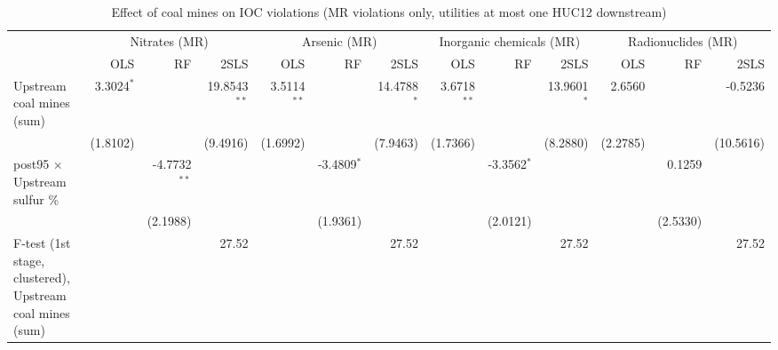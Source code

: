 
\begin{table}[htbp]
   
   \caption{\label{2sls_dwnstrm_minevio_mr_ivsum} Effect of coal mines on IOC violations (MR violations only, utilities at most one HUC12 downstream)}
   \bigskip
   
   \centering
   
   \begin{adjustbox}{width = \textwidth, center}
      
      
      \begin{tabular}{lrrrrrrrrrrrr}
         \toprule
         
          & \multicolumn{3}{c}{Nitrates (MR)} & \multicolumn{3}{c}{Arsenic (MR)} & \multicolumn{3}{c}{Inorganic chemicals (MR)} & \multicolumn{3}{c}{Radionuclides (MR)}\\
         
                                                                  & OLS          & RF             & 2SLS           & OLS           & RF            & 2SLS          & OLS           & RF            & 2SLS          & OLS      & RF       & 2SLS\\  
         
         \midrule 
         Upstream coal mines (sum)                                & 3.3024$^{*}$ &                & 19.8543$^{**}$ & 3.5114$^{**}$ &               & 14.4788$^{*}$ & 3.6718$^{**}$ &               & 13.9601$^{*}$ & 2.6560   &          & -0.5236\\   
                                                                  & (1.8102)     &                & (9.4916)       & (1.6992)      &               & (7.9463)      & (1.7366)      &               & (8.2880)      & (2.2785) &          & (10.5616)\\   
         post95 $\times$ Upstream sulfur \%                       &              & -4.7732$^{**}$ &                &               & -3.4809$^{*}$ &               &               & -3.3562$^{*}$ &               &          & 0.1259   &   \\   
                                                                  &              & (2.1988)       &                &               & (1.9361)      &               &               & (2.0121)      &               &          & (2.5330) &   \\   
         
         F-test (1st stage, clustered), Upstream coal mines (sum) &              &                & 27.52          &               &               & 27.52         &               &               & 27.52         &          &          & 27.52\\  
         

\end{tabular}
\end{adjustbox}
\end{table}

